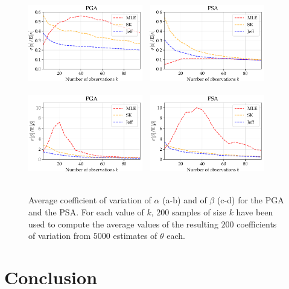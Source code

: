     \begin{figure}[!ht]
        \centering
        {\includegraphics[width=5cm]{figures/uncIM/coeff_alpha_PGA.pdf}}\ %
        {\includegraphics[width=5cm]{figures/uncIM/coeff_alpha_PSA.pdf}} \\
        \ \\
        {\includegraphics[width=5cm]{figures/uncIM/coeff_beta_PGA.pdf}}\ %
         {\includegraphics[width=5cm]{figures/uncIM/coeff_beta_PSA.pdf}}\\
         \ \\
         \caption{Average coefficient of variation of $\alpha$ (a-b) and of $\beta$ (c-d) for the PGA and the PSA. For each value of $k$, $200$ samples of size $k$ have been used to compute the average values of the resulting $200$ coefficients of variation from $5000$ estimates of $\theta$ each.}
           \label{uncIM:fig:ASG_CoV}
    \end{figure}


\section{Conclusion}  \label{uncIM:sec:conclusion}

